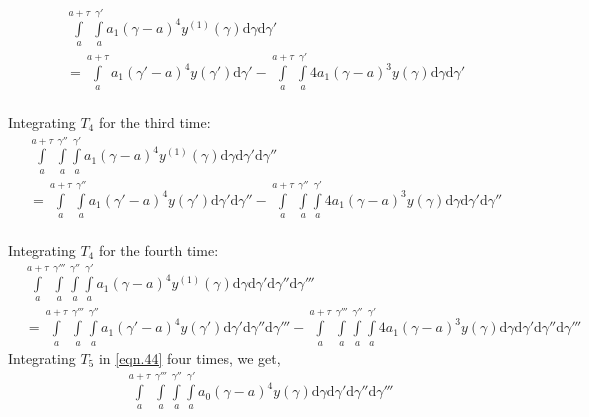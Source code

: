\documentclass{article}
\begin{document}
\begin{equation}
\begin{split}
	&\int\limits_{a}^{a+\tau}\int\limits_{a}^{\gamma'}a_1(\gamma-a)^{4}y^{(1)}(\gamma)\mathrm{d}\gamma\mathrm{d}\gamma'\\
	&=\int\limits_{a}^{a+\tau}a_1(\gamma'-a)^4y(\gamma')\mathrm{d}\gamma' - \int\limits_{a}^{a+\tau}\int\limits_{a}^{\gamma'}4a_1(\gamma-a)^3y(\gamma)\mathrm{d}\gamma\mathrm{d}\gamma'
\end{split}
\end{equation}
\\Integrating $T_4$ for the third time:
\begin{equation}
\begin{split}
	&\int\limits_{a}^{a+\tau}\int\limits_{a}^{\gamma''}\int\limits_{a}^{\gamma'}a_1(\gamma-a)^{4}y^{(1)}(\gamma)\mathrm{d}\gamma\mathrm{d}\gamma'\mathrm{d}\gamma''\\
	&=\int\limits_{a}^{a+\tau}\int\limits_{a}^{\gamma''}a_1(\gamma'-a)^4y(\gamma')\mathrm{d}\gamma'\mathrm{d}\gamma'' - \int\limits_{a}^{a+\tau}\int\limits_{a}^{\gamma''}\int\limits_{a}^{\gamma'}4a_1(\gamma-a)^3y(\gamma)\mathrm{d}\gamma\mathrm{d}\gamma'\mathrm{d}\gamma''
\end{split}
\end{equation}
\\Integrating $T_4$ for the fourth time:
\begin{equation}
\begin{split}
	&\int\limits_{a}^{a+\tau}\int\limits_{a}^{\gamma'''}\int\limits_{a}^{\gamma''}\int\limits_{a}^{\gamma'}a_1(\gamma-a)^{4}y^{(1)}(\gamma)\mathrm{d}\gamma\mathrm{d}\gamma'\mathrm{d}\gamma''\mathrm{d}\gamma'''\\
	&=\int\limits_{a}^{a+\tau}\int\limits_{a}^{\gamma'''}\int\limits_{a}^{\gamma''}a_1(\gamma'-a)^4y(\gamma')\mathrm{d}\gamma'\mathrm{d}\gamma''\mathrm{d}\gamma''' - \int\limits_{a}^{a+\tau}\int\limits_{a}^{\gamma'''}\int\limits_{a}^{\gamma''}\int\limits_{a}^{\gamma'}4a_1(\gamma-a)^3y(\gamma)\mathrm{d}\gamma\mathrm{d}\gamma'\mathrm{d}\gamma''\mathrm{d}\gamma'''
\end{split}
\end{equation}
Integrating $T_5$ in \eqref{eqn.44} four times, we get,
\begin{equation}
\begin{split}
	\int\limits_{a}^{a+\tau}\int\limits_{a}^{\gamma'''}\int\limits_{a}^{\gamma''}\int\limits_{a}^{\gamma'}a_0(\gamma-a)^4y(\gamma)\mathrm{d}\gamma\mathrm{d}\gamma'\mathrm{d}\gamma''\mathrm{d}\gamma'''
\end{split}
\end{equation}
\end{document}
